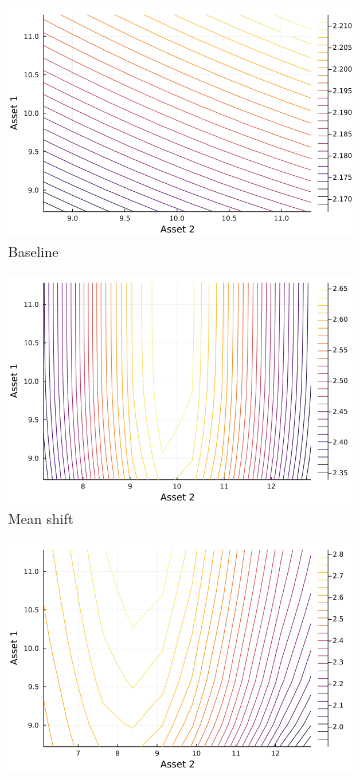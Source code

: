 \documentclass{article}
\begin{document}
\begin{figure}
    \centering
    \begin{subfigure}{0.4\textwidth}
        \includegraphics[width=\textwidth]{../plots/params/baseline/entropy_upper.png}
        \caption{Baseline}
    \end{subfigure}
    \begin{subfigure}{0.4\textwidth}
        \includegraphics[width=\textwidth]{../plots/params/a2-mean-shift/entropy_upper.png}
        \caption{Mean shift}
    \end{subfigure}
    \begin{subfigure}{0.4\textwidth}
        \includegraphics[width=\textwidth]{../plots/params/a2-meanvar-shift/entropy_upper.png}

\end{subfigure}
\end{figure}
\end{document}
